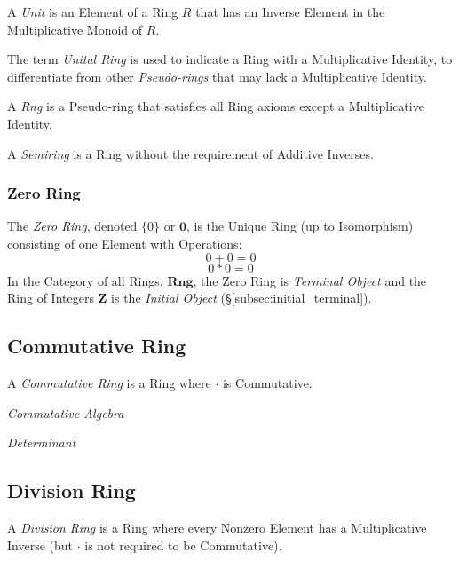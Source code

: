 A \emph{Unit} is an Element of a Ring $R$ that has an Inverse
Element in the Multiplicative Monoid of $R$.

The term \emph{Unital Ring} is used to indicate a Ring with a
Multiplicative Identity, to differentiate from other
\emph{Pseudo-rings} that may lack a Multiplicative Identity.

A \emph{Rng} is a Pseudo-ring that satisfies all Ring axioms except a
Multiplicative Identity.

A \emph{Semiring} is a Ring without the requirement of Additive
Inverses.



\subsubsection{Zero Ring}\label{subsec:zero_ring}

The \emph{Zero Ring}, denoted $\{0\}$ or $\mathbf{0}$, is the Unique Ring
(up to Isomorphism) consisting of one Element with Operations:
\[
    0 + 0 = 0
\] \[
    0 * 0 = 0
\]
In the Category of all Rings, $\mathbf{Rng}$, the Zero Ring is
\emph{Terminal Object} and the Ring of Integers $\mathbf{Z}$ is the
\emph{Initial Object} (\S\ref{subsec:initial_terminal}).



\subsection{Commutative Ring}\label{subsec:commutative_ring}

A \emph{Commutative Ring} is a Ring where $\cdot$ is Commutative.

\emph{Commutative Algebra}

\emph{Determinant}



\subsection{Division Ring}\label{subsec:division_ring}

A \emph{Division Ring} is a Ring where every Nonzero Element has a
Multiplicative Inverse (but $\cdot$ is not required to be
Commutative).



